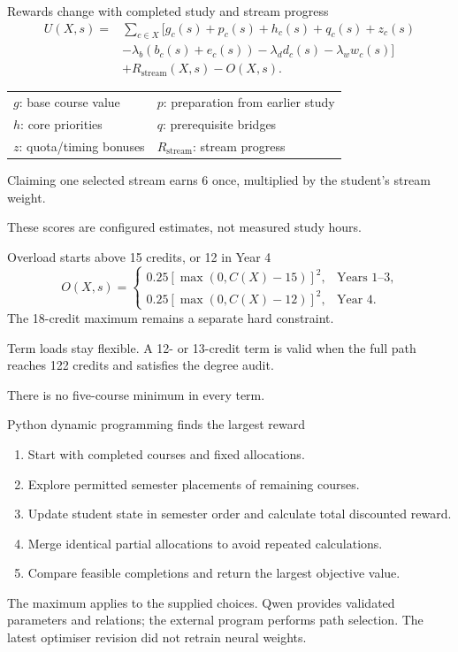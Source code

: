 \documentclass[aspectratio=169,11pt]{beamer}
\newcommand{\smallnote}[1]{\par{\footnotesize\color{muted}#1\par}}
\begin{document}
\begin{frame}{Rewards change with completed study and stream progress}
\begin{align*}
U(X,s)={}&\sum_{c\in X}\bigl[g_c(s)+p_c(s)+h_c(s)+q_c(s)+z_c(s)\\
 &-\lambda_b(b_c(s)+e_c(s))-\lambda_d d_c(s)-\lambda_w w_c(s)\bigr]\\
 &+R_{\mathrm{stream}}(X,s)-O(X,s).
\end{align*}
\begin{tabular}{L{6.2cm}L{6cm}}
$g$: base course value & $p$: preparation from earlier study\\
$h$: core priorities & $q$: prerequisite bridges\\
$z$: quota/timing bonuses & $R_{\mathrm{stream}}$: stream progress\\
\end{tabular}\par
\vspace{2mm}
Claiming one selected stream earns 6 once, multiplied by the student's stream weight.
\smallnote{These scores are configured estimates, not measured study hours.}
\end{frame}

\begin{frame}{Overload starts above 15 credits, or 12 in Year 4}
\[
O(X,s)=\begin{cases}
0.25[\max(0,C(X)-15)]^2,&\text{Years 1--3},\\[6pt]
0.25[\max(0,C(X)-12)]^2,&\text{Year 4}.
\end{cases}
\]
\vspace{3mm}
The 18-credit maximum remains a separate hard constraint.

Term loads stay flexible. A 12- or 13-credit term is valid when the full path reaches 122 credits and satisfies the degree audit.
\smallnote{There is no five-course minimum in every term.}
\end{frame}

\begin{frame}{Python dynamic programming finds the largest reward}
\begin{enumerate}\setlength{\itemsep}{7pt}
\item Start with completed courses and fixed allocations.
\item Explore permitted semester placements of remaining courses.
\item Update student state in semester order and calculate total discounted reward.
\item Merge identical partial allocations to avoid repeated calculations.
\item Compare feasible completions and return the largest objective value.
\end{enumerate}
\smallnote{The maximum applies to the supplied choices. Qwen provides validated parameters and relations; the external program performs path selection. The latest optimiser revision did not retrain neural weights.}
\end{frame}
\end{document}
